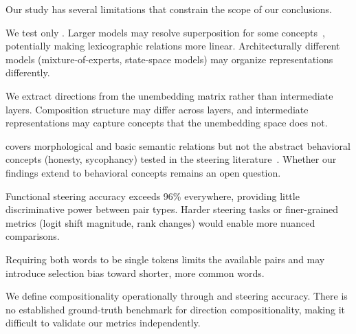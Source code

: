 Our study has several limitations that constrain the scope of our conclusions.

We test only \pythia.
Larger models may resolve superposition for some concepts~\citep{elhage2022superposition}, potentially making lexicographic relations more linear.
Architecturally different models (mixture-of-experts, state-space models) may organize representations differently.

We extract directions from the unembedding matrix rather than intermediate layers.
Composition structure may differ across layers, and intermediate representations may capture concepts that the unembedding space does not.

\bats covers morphological and basic semantic relations but not the abstract behavioral concepts (honesty, sycophancy) tested in the steering literature~\citep{zou2023representation,panickssery2023steering}.
Whether our findings extend to behavioral concepts remains an open question.

Functional steering accuracy exceeds 96\% everywhere, providing little discriminative power between pair types.
Harder steering tasks or finer-grained metrics (logit shift magnitude, rank changes) would enable more nuanced comparisons.

Requiring both words to be single tokens limits the available pairs and may introduce selection bias toward shorter, more common words.

We define compositionality operationally through \cfs and steering accuracy.
There is no established ground-truth benchmark for direction compositionality, making it difficult to validate our metrics independently.
